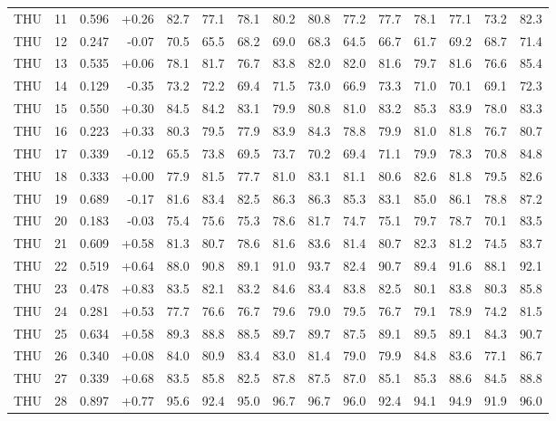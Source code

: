 \begin{longtable}{@{}llrrrrrrrrrrrrr@{}}
THU & 11 & 0.596 & +0.26 & 82.7 & 77.1 & 78.1 & 80.2 & 80.8 & 77.2 & 77.7 & 78.1 & 77.1 & 73.2 & 82.3 \\
THU & 12 & 0.247 & -0.07 & 70.5 & 65.5 & 68.2 & 69.0 & 68.3 & 64.5 & 66.7 & 61.7 & 69.2 & 68.7 & 71.4 \\
THU & 13 & 0.535 & +0.06 & 78.1 & 81.7 & 76.7 & 83.8 & 82.0 & 82.0 & 81.6 & 79.7 & 81.6 & 76.6 & 85.4 \\
THU & 14 & 0.129 & -0.35 & 73.2 & 72.2 & 69.4 & 71.5 & 73.0 & 66.9 & 73.3 & 71.0 & 70.1 & 69.1 & 72.3 \\
THU & 15 & 0.550 & +0.30 & 84.5 & 84.2 & 83.1 & 79.9 & 80.8 & 81.0 & 83.2 & 85.3 & 83.9 & 78.0 & 83.3 \\
THU & 16 & 0.223 & +0.33 & 80.3 & 79.5 & 77.9 & 83.9 & 84.3 & 78.8 & 79.9 & 81.0 & 81.8 & 76.7 & 80.7 \\
THU & 17 & 0.339 & -0.12 & 65.5 & 73.8 & 69.5 & 73.7 & 70.2 & 69.4 & 71.1 & 79.9 & 78.3 & 70.8 & 84.8 \\
THU & 18 & 0.333 & +0.00 & 77.9 & 81.5 & 77.7 & 81.0 & 83.1 & 81.1 & 80.6 & 82.6 & 81.8 & 79.5 & 82.6 \\
THU & 19 & 0.689 & -0.17 & 81.6 & 83.4 & 82.5 & 86.3 & 86.3 & 85.3 & 83.1 & 85.0 & 86.1 & 78.8 & 87.2 \\
THU & 20 & 0.183 & -0.03 & 75.4 & 75.6 & 75.3 & 78.6 & 81.7 & 74.7 & 75.1 & 79.7 & 78.7 & 70.1 & 83.5 \\
THU & 21 & 0.609 & +0.58 & 81.3 & 80.7 & 78.6 & 81.6 & 83.6 & 81.4 & 80.7 & 82.3 & 81.2 & 74.5 & 83.7 \\
THU & 22 & 0.519 & +0.64 & 88.0 & 90.8 & 89.1 & 91.0 & 93.7 & 82.4 & 90.7 & 89.4 & 91.6 & 88.1 & 92.1 \\
THU & 23 & 0.478 & +0.83 & 83.5 & 82.1 & 83.2 & 84.6 & 83.4 & 83.8 & 82.5 & 80.1 & 83.8 & 80.3 & 85.8 \\
THU & 24 & 0.281 & +0.53 & 77.7 & 76.6 & 76.7 & 79.6 & 79.0 & 79.5 & 76.7 & 79.1 & 78.9 & 74.2 & 81.5 \\
THU & 25 & 0.634 & +0.58 & 89.3 & 88.8 & 88.5 & 89.7 & 89.7 & 87.5 & 89.1 & 89.5 & 89.1 & 84.3 & 90.7 \\
THU & 26 & 0.340 & +0.08 & 84.0 & 80.9 & 83.4 & 83.0 & 81.4 & 79.0 & 79.9 & 84.8 & 83.6 & 77.1 & 86.7 \\
THU & 27 & 0.339 & +0.68 & 83.5 & 85.8 & 82.5 & 87.8 & 87.5 & 87.0 & 85.1 & 85.3 & 88.6 & 84.5 & 88.8 \\
THU & 28 & 0.897 & +0.77 & 95.6 & 92.4 & 95.0 & 96.7 & 96.7 & 96.0 & 92.4 & 94.1 & 94.9 & 91.9 & 96.0 \\

\end{longtable}
